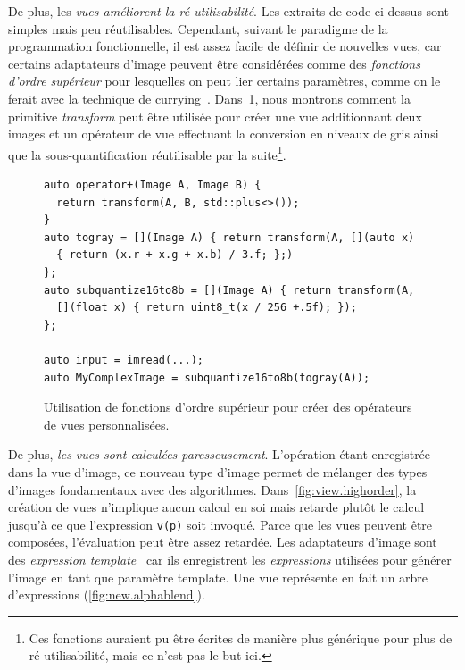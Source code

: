 De plus, les \emph{vues améliorent la ré-utilisabilité}. Les extraits de code ci-dessus sont simples mais peu
réutilisables. Cependant, suivant le paradigme de la programmation fonctionnelle, il est assez facile de définir de
nouvelles vues, car certains adaptateurs d'image peuvent être considérées comme des \emph{fonctions d'ordre supérieur}
pour lesquelles on peut lier certains paramètres, comme on le ferait avec la technique de
currying~\parencite{hanus.1995.curry}. Dans~\cref{resume:fig:view.highorder}, nous montrons comment la primitive
\emph{transform} peut être utilisée pour créer une vue additionnant deux images et un opérateur de vue effectuant la
conversion en niveaux de gris ainsi que la sous-quantification réutilisable par la suite\footnote{Ces fonctions auraient
  pu être écrites de manière plus générique pour plus de ré-utilisabilité, mais ce n'est pas le but ici.}.

\begin{figure}
  \begin{verbatim}
auto operator+(Image A, Image B) {
  return transform(A, B, std::plus<>());
}
auto togray = [](Image A) { return transform(A, [](auto x)
  { return (x.r + x.g + x.b) / 3.f; };)
};
auto subquantize16to8b = [](Image A) { return transform(A,
  [](float x) { return uint8_t(x / 256 +.5f); });
};

auto input = imread(...);
auto MyComplexImage = subquantize16to8b(togray(A));
  \end{verbatim}

  \caption[]{Utilisation de fonctions d'ordre supérieur pour créer des opérateurs de vues personnalisées.}
  \label{resume:fig:view.highorder}
\end{figure}

De plus, \emph{les vues sont calculées paresseusement}. L'opération étant enregistrée dans la vue d'image, ce nouveau
type d'image permet de mélanger des types d'images fondamentaux avec des algorithmes. Dans~\cref{fig:view.highorder}, la
création de vues n'implique aucun calcul en soi mais retarde plutôt le calcul jusqu'à ce que l'expression \texttt{v(p)}
soit invoqué. Parce que les vues peuvent être composées, l'évaluation peut être assez retardée. Les adaptateurs d'image
sont des \emph{expression template}~\parencite{veldhuizen.1995.expression, veldhuizen.2000.blitz} car ils enregistrent
les \emph{expressions} utilisées pour générer l'image en tant que paramètre template. Une vue représente en fait un
arbre d'expressions (\cref{fig:new.alphablend}).

